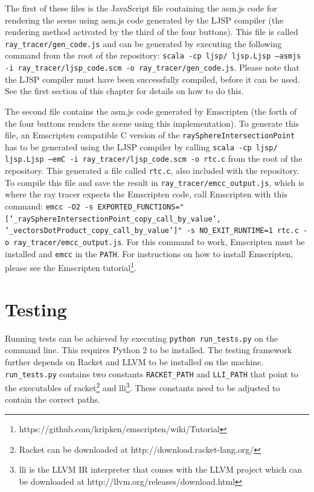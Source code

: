 \documentclass[11pt]{report}
\begin{document}
The first of these files is the JavaScript file containing the asm.js code for rendering the scene using asm.js code generated by the LJSP compiler (the rendering method activated by the third of the four buttons). This file is called \texttt{ray_tracer/gen_code.js} and can be generated by executing the following command from the root of the repository: \texttt{scala -cp ljsp/ ljsp.Ljsp --asmjs -i ray_tracer/ljsp_code.scm -o ray_tracer/gen_code.js}. Please note that the LJSP compiler must have been successfully compiled, before it can be used. See the first section of this chapter for details on how to do this.

The second file contains the asm.js code generated by Emscripten (the forth of the four buttons renders the scene using this implementation). To generate this file, an Emscripten compatible C version of the \texttt{raySphereIntersectionPoint} has to be generated using the LJSP compiler by calling \texttt{scala -cp ljsp/ ljsp.Ljsp --emC -i ray_tracer/ljsp_code.scm -o rtc.c} from the root of the repository. This generated a file called \texttt{rtc.c}, also included with the repository. To compile this file and save the result in \texttt{ray_tracer/emcc_output.js}, which is where the ray tracer expects the Emscripten code, call Emscripten with this command: \texttt{emcc -O2 -s EXPORTED_FUNCTIONS="['_raySphereIntersectionPoint_copy_call_by_value', '_vectorsDotProduct_copy_call_by_value']" -s NO_EXIT_RUNTIME=1 rtc.c -o ray_tracer/emcc_output.js}. For this command to work, Emscripten must be installed and \texttt{emcc} in the \texttt{PATH}. For instructions on how to install Emscripten, please see the Emscripten tutorial\footnote{https://github.com/kripken/emscripten/wiki/Tutorial}.

\section{Testing}
Running tests can be achieved by executing \texttt{python run_tests.py} on the command line. This requires Python 2 to be installed. The testing framework further depends on Racket and LLVM to be installed on the machine. \texttt{run_tests.py} contains two constants \texttt{RACKET_PATH} and \texttt{LLI_PATH} that point to the executables of racket\footnote{Racket can be downloaded at http://download.racket-lang.org/} and lli\footnote{lli is the LLVM IR interpreter that comes with the LLVM project which can be downloaded at http://llvm.org/releases/download.html}. These constants need to be adjusted to contain the correct paths.
\end{document}
